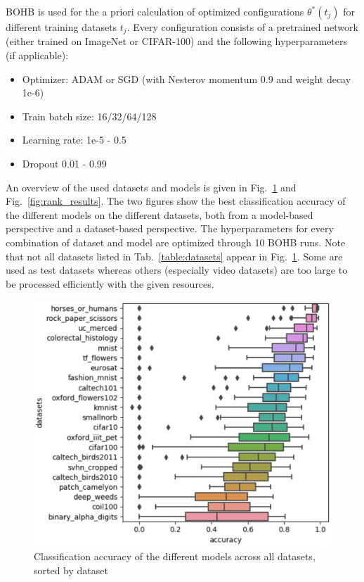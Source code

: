 \documentclass{article}
\begin{document}
BOHB is used for the a priori calculation of optimized configurations $\theta^*(t_j)$ for different training datasets $t_j$. Every configuration consists of a pretrained network (either trained on ImageNet or CIFAR-100) and the following hyperparameters (if applicable):
%
\begin{itemize}
\item Optimizer: ADAM or SGD (with Nesterov momentum 0.9 and weight decay 1e-6)
\item Train batch size: 16/32/64/128
\item Learning rate: 1e-5 - 0.5
\item Dropout 0.01 - 0.99
\end{itemize}
%
An overview of the used datasets and models is given in Fig.~\ref{fig:dataset_results} and Fig.~\ref{fig:rank_results}. The two figures show the best classification accuracy of the different models on the different datasets, both from a model-based perspective and a dataset-based perspective. The hyperparameters for every combination of dataset and model are optimized through 10 BOHB runs. Note that not all datasets listed in Tab.~\ref{table:datasets} appear in Fig.~\ref{fig:dataset_results}. Some are used as test datasets whereas others (especially video datasets) are too large to be processed efficiently with the given resources.

\begin{figure}[htb]
\begin{center}
 	\includegraphics[width=0.85\linewidth]{../figures/dataset_results.eps} 
\end{center}
\caption{Classification accuracy of the different models across all datasets, sorted by dataset}
\label{fig:dataset_results}
\end{figure} 
\end{document}
